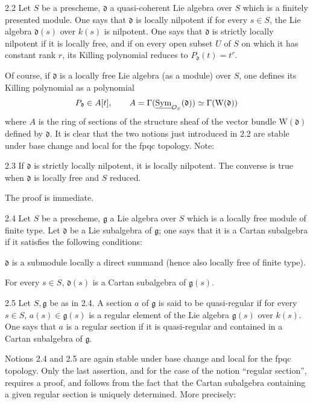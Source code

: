 \begin{definition}{2.2}\label{XIV.2.2}
Let $S$ be a prescheme, $\mathfrak d$ a quasi-coherent Lie algebra
over $S$ which is a finitely presented module. One says that
$\mathfrak d$ is locally nilpotent if for every $s\in S$, the
Lie algebra $\mathfrak d(s)$ over $k(s)$ is nilpotent. One says
that $\mathfrak d$ is strictly locally nilpotent if it is locally
free, and if on every open subset $U$ of $S$ on which it has
constant rank $r$, its Killing polynomial reduces to
$P_{\mathfrak d}(t)=t^r$.
\end{definition}
Of course, if $\mathfrak d$ is a locally free Lie algebra (as a
module) over $S$, one defines its Killing polynomial as a polynomial
\[
 P_{\mathfrak d}\in A[t],\qquad
 A=\Gamma(\underline{\operatorname{Sym}}_{\mathcal{O}_S}(\mathfrak d))
 \simeq\Gamma(\mathrm W(\mathfrak d))
\]
where $A$ is the ring of sections of the structure sheaf of the
vector bundle $\mathrm W(\mathfrak d)$ defined by $\mathfrak d$.
It is clear that the two notions just introduced in 2.2 are stable
under base change and local for the fpqc topology. Note:

\begin{proposition}{2.3}\label{XIV.2.3}
If $\mathfrak d$ is strictly locally nilpotent, it is locally
nilpotent. The converse is true when $\mathfrak d$ is locally
free and $S$ reduced.
\end{proposition}
The proof is immediate.

\begin{definition}{2.4}\label{XIV.2.4}
Let $S$ be a prescheme, $\mathfrak g$ a Lie algebra over $S$
which is a locally free module of finite type. Let $\mathfrak d$
be a Lie subalgebra of $\mathfrak g$; one says that it is a
Cartan subalgebra if it satisfies the following conditions:
\begin{enumeratei}
\item $\mathfrak d$ is a submodule locally a direct summand
(hence also locally free of finite type).
\item For every $s\in S$, $\mathfrak d(s)$ is a Cartan subalgebra
of $\mathfrak g(s)$.
\end{enumeratei}
\end{definition}

\begin{definition}{2.5}\label{XIV.2.5}
Let $S,\mathfrak g$ be as in 2.4. A section $a$ of
$\mathfrak g$ is said to be quasi-regular if for every $s\in S$,
$a(s)\in\mathfrak g(s)$ is a regular element of the Lie algebra
$\mathfrak g(s)$ over $k(s)$. One says that $a$ is a regular
section if it is quasi-regular and contained in a Cartan
subalgebra of $\mathfrak g$.
\end{definition}
Notions 2.4 and 2.5 are again stable under base change and local
for the fpqc topology. Only the last assertion, and for the
case of the notion ``regular section'', requires a proof,
and follows from the fact that the Cartan subalgebra containing
a given regular section is uniquely determined. More precisely:

